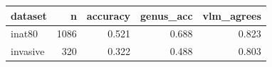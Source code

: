 \begin{tabular}{lrrrr}
\toprule
dataset & n & accuracy & genus_acc & vlm_agrees \\
\midrule
inat80 & 1086 & 0.521 & 0.688 & 0.823 \\
invasive & 320 & 0.322 & 0.488 & 0.803 \\
\bottomrule
\end{tabular}
